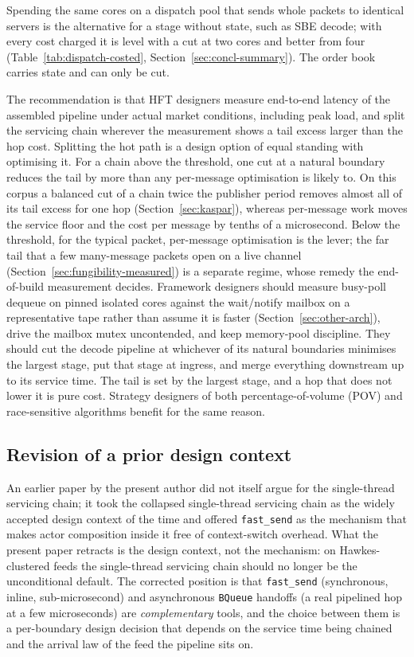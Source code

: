 \documentclass[11pt]{article}
\begin{document}
Spending the same cores on a dispatch pool that sends whole packets to identical servers
is the alternative for a stage without state, such as SBE decode; with every cost
charged it is level with a cut at two cores and better from four
(Table~\ref{tab:dispatch-costed}, Section~\ref{sec:concl-summary}). The order book
carries state and can only be cut.

The recommendation is that HFT designers measure end-to-end latency of the assembled
pipeline under actual market conditions, including peak load, and split the servicing
chain wherever the measurement shows a tail excess larger than the hop cost. Splitting the
hot path is a design option of equal standing with optimising it. For a chain above the threshold, one cut at a natural boundary reduces the tail by more
than any per-message optimisation is likely to. On this corpus a balanced cut of a chain
twice the publisher period removes almost all of its tail excess for one hop
(Section~\ref{sec:kaspar}), whereas per-message work moves the service floor and the cost
per message by tenths of a microsecond. Below the threshold, for the typical packet, per-message optimisation is the
lever; the far tail that a few many-message packets open on a live channel
(Section~\ref{sec:fungibility-measured}) is a separate regime, whose remedy the
end-of-build measurement decides. Framework designers should measure busy-poll dequeue on pinned isolated cores against
the wait/notify mailbox on a representative tape rather than assume it is faster
(Section~\ref{sec:other-arch}), drive the mailbox mutex uncontended, and keep memory-pool
discipline. They should cut the decode pipeline at whichever of its natural boundaries
minimises the largest stage, put that stage at ingress, and merge everything downstream
up to its service time. The tail is set by the largest stage, and a hop that does not
lower it is pure cost. Strategy designers of both percentage-of-volume (POV)
and race-sensitive algorithms benefit for the same reason.

\subsection{Revision of a prior design context}
\label{sec:concl-revision}

An earlier paper by the present author \citep{mayeski_fastsend} did not itself argue for
the single-thread servicing chain; it took the collapsed single-thread servicing chain as
the widely accepted design context of the time and offered \texttt{fast\_send} as the
mechanism that makes actor composition inside it free of context-switch overhead. What the
present paper retracts is the design context, not the mechanism: on Hawkes-clustered feeds
the single-thread servicing chain should no longer be the unconditional default. The
corrected position is that \texttt{fast\_send} (synchronous, inline, sub-microsecond) and
asynchronous \texttt{BQueue} handoffs (a real pipelined hop at a few microseconds) are
\emph{complementary} tools, and the choice between them is a per-boundary design decision
that depends on the service time being chained and the arrival law of the feed the
pipeline sits on.
\end{document}
